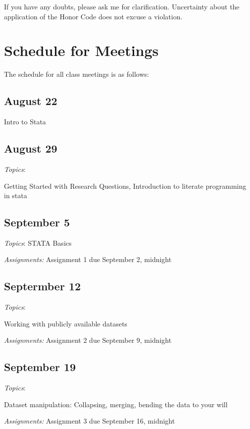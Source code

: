 \documentclass[12pt]{article}
\begin{document}
If you have any doubts, please ask me for clarification. Uncertainty
about the application of the Honor Code does not excuse a violation.

\section{Schedule for Meetings}

The schedule for all class meetings is as follows:

\begin{flushleft}


\subsection{August 22}

Intro to Stata

\subsection{August 29}

\textit{Topics}:

Getting Started with Research Questions, Introduction to literate
programming in stata

\subsection{September 5}


\textit{Topics}:
STATA Basics

\textit {Assignments:}
Assignment 1 due September 2, midnight

\subsection{Septermber 12}

\textit{Topics}:

Working with publicly available datasets

\textit {Assignments:}
Assignment 2 due September 9, midnight

\subsection{September 19}


\textit{Topics}:

Dataset manipulation: Collapsing, merging, bending the data to your will


\textit {Assignments:}
Assignment 3 due September 16, midnight

\end{flushleft}
\end{document}
